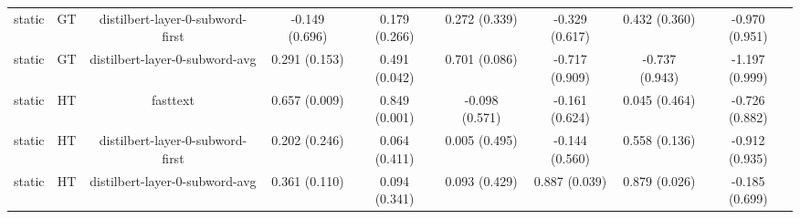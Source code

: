 \begin{sidewaystable}[htb]
\begin{tabular}{@{}ccccccccc@{}}
        static & GT & distilbert-layer-0-subword-first & -0.149 (0.696) & 0.179 (0.266) & 0.272 (0.339) & -0.329 (0.617) & 0.432 (0.360) & -0.970 (0.951) \\
        static & GT & distilbert-layer-0-subword-avg & 0.291 (0.153) & 0.491 (0.042) & 0.701 (0.086) & -0.717 (0.909) & -0.737 (0.943) & -1.197 (0.999) \\
        static & HT & fasttext & 0.657 (0.009) & 0.849 (0.001) & -0.098 (0.571) & -0.161 (0.624) & 0.045 (0.464) & -0.726 (0.882) \\
        static & HT & distilbert-layer-0-subword-first & 0.202 (0.246) & 0.064 (0.411) & 0.005 (0.495) & -0.144 (0.560) & 0.558 (0.136) & -0.912 (0.935) \\
        static & HT & distilbert-layer-0-subword-avg & 0.361 (0.110) & 0.094 (0.341) & 0.093 (0.429) & 0.887 (0.039) & 0.879 (0.026) & -0.185 (0.699) \\
        \bottomrule
    \end{tabular}
\end{sidewaystable}